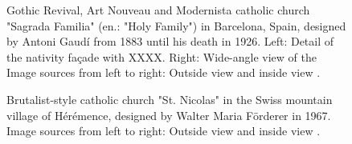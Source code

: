 \documentclass{article}
\begin{document}
\begin{figure}
    \centering
    \caption{Gothic Revival, Art Nouveau and Modernista catholic church "Sagrada Familia" (en.: "Holy Family") in Barcelona, Spain, designed by Antoni Gaudí from 1883 until his death in 1926. Left: Detail of the nativity façade with XXXX. Right: Wide-angle view of the   Image sources from left to right: Outside view \cite{mortel_sagrada_2016} and inside view \cite{wikimedia_commons_user_t_meltzer_sagrada_2014}.}
    \label{fig:kunstformen}
\end{figure}

\begin{figure}
    \centering
    \caption{Brutalist-style catholic church "St. Nicolas" in the Swiss mountain village of Hérémence, designed by Walter Maria Förderer in 1967. Image sources from left to right: Outside view \cite{bissegger_eglise_2018-1} and inside view \cite{bissegger_eglise_2018}.}
    \label{fig:kunstformen}
\end{figure}
\end{document}
